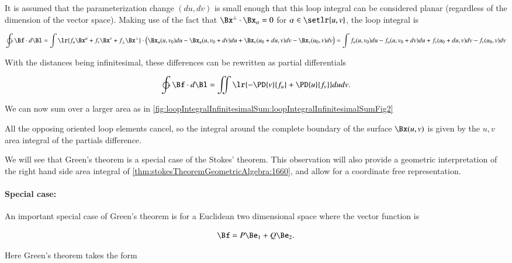 It is assumed that the parameterization change \((du, dv)\) is small enough that this loop integral can be considered planar (regardless of the dimension of the vector space).
Making use of the fact that \(\Bx^\perp \cdot \Bx_\alpha = 0\) for \(\alpha \in \setlr{u,v}\), the loop integral is

\begin{dmath}\label{eqn:stokesTheoremGeometricAlgebra:1620}
\ointctrclockwise \Bf \cdot d\Bl
=
\int
\lr{
f_u \Bx^u + f_v \Bx^v + f_\perp \Bx^\perp
}
\cdot
\Bigl(
\Bx_u(u, v_0) du - \Bx_u(u, v_0 + dv) du
+\Bx_v(u_0 + du, v) dv - \Bx_v(u_0, v) dv
\Bigr)
=
\int
f_u(u, v_0) du - f_u(u, v_0 + dv) du
+
f_v(u_0 + du, v) dv - f_v(u_0, v) dv
\end{dmath}

With the distances being infinitesimal, these differences can be rewritten as partial differentials

\begin{dmath}\label{eqn:stokesTheoremGeometricAlgebra:1860}
\ointctrclockwise \Bf \cdot d\Bl
=
\iint \lr{
-\PD{v}{f_u}
+\PD{u}{f_v}
}
du dv.
\end{dmath}

We can now sum over a larger area as in \cref{fig:loopIntegralInfinitesimalSum:loopIntegralInfinitesimalSumFig2}


All the opposing oriented loop elements cancel, so the integral around the complete boundary of the surface \(\Bx(u, v)\) is given by the \(u,v\) area integral of the partials difference.

We will see that Green's theorem is a special case of the Stokes' theorem.
This observation will also provide a geometric interpretation of the right hand side area integral of \cref{thm:stokesTheoremGeometricAlgebra:1660}, and allow for a coordinate free representation.

\paragraph{Special case:}

An important special case of Green's theorem is for a Euclidean two dimensional space where the vector function is

\begin{dmath}\label{eqn:stokesTheoremGeometricAlgebra:1720}
\Bf = P \Be_1 + Q \Be_2.
\end{dmath}

Here Green's theorem takes the form


